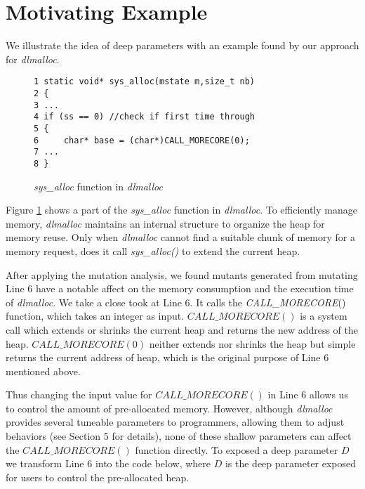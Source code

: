 
\section{Motivating Example}

We illustrate the idea of deep parameters with an example found by our approach for \emph{dlmalloc}.

\begin{figure}[ht]
\begin{lstlisting}
1 static void* sys_alloc(mstate m,size_t nb) 
2 {
3 ...
4 if (ss == 0) //check if first time through
5 { 
6     char* base = (char*)CALL_MORECORE(0);
7 ...
8 }
\end{lstlisting}
\vspace{-1.5em}
\caption{\emph{sys\_alloc} function in \emph{dlmalloc}}
\label{exp}
\end{figure}

Figure \ref{exp} shows a part of the \emph{sys\_alloc} function in \emph{dlmalloc}. To efficiently manage memory, \emph{dlmalloc} maintains an internal structure to organize the heap for memory reuse. Only when \emph{dlmalloc} cannot find a suitable chunk of memory for a memory request, does it call \emph{sys\_alloc()} to extend the current heap.

After applying the mutation analysis, we found mutants generated from mutating Line 6 have a notable affect on the memory consumption and the execution time of \emph{dlmalloc}. We take a close took at Line 6. It calls the \emph{CALL\_MORECORE}() function, which takes an integer as input. $CALL\_MORECORE()$ is a system call which extends or shrinks the current heap and returns the new address of the heap. $CALL\_MORECORE(0)$ neither extends nor shrinks the heap but simple returns the current address of heap, which is the original purpose of Line 6 mentioned above.

Thus changing the input value for $CALL\_MORECORE()$ in Line 6 allows us to control the amount of pre-allocated memory. However, although \emph{dlmalloc} provides several tuneable parameters to programmers, allowing them to adjust behaviors (see Section 5 for details), none of these shallow parameters can affect the $CALL\_MORECORE()$ function directly. To exposed a deep parameter $D$ we transform Line 6 into the code below, where $D$ is the deep parameter exposed for users to control the pre-allocated heap.

